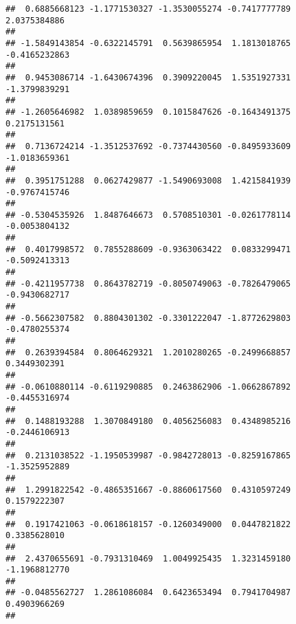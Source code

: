 \documentclass[]{article}
\begin{document}
\begin{verbatim}
##  0.6885668123 -1.1771530327 -1.3530055274 -0.7417777789  2.0375384886 
##                                                                       
## -1.5849143854 -0.6322145791  0.5639865954  1.1813018765 -0.4165232863 
##                                                                       
##  0.9453086714 -1.6430674396  0.3909220045  1.5351927331 -1.3799839291 
##                                                                       
## -1.2605646982  1.0389859659  0.1015847626 -0.1643491375  0.2175131561 
##                                                                       
##  0.7136724214 -1.3512537692 -0.7374430560 -0.8495933609 -1.0183659361 
##                                                                       
##  0.3951751288  0.0627429877 -1.5490693008  1.4215841939 -0.9767415746 
##                                                                       
## -0.5304535926  1.8487646673  0.5708510301 -0.0261778114 -0.0053804132 
##                                                                       
##  0.4017998572  0.7855288609 -0.9363063422  0.0833299471 -0.5092413313 
##                                                                       
## -0.4211957738  0.8643782719 -0.8050749063 -0.7826479065 -0.9430682717 
##                                                                       
## -0.5662307582  0.8804301302 -0.3301222047 -1.8772629803 -0.4780255374 
##                                                                       
##  0.2639394584  0.8064629321  1.2010280265 -0.2499668857  0.3449302391 
##                                                                       
## -0.0610880114 -0.6119290885  0.2463862906 -1.0662867892 -0.4455316974 
##                                                                       
##  0.1488193288  1.3070849180  0.4056256083  0.4348985216 -0.2446106913 
##                                                                       
##  0.2131038522 -1.1950539987 -0.9842728013 -0.8259167865 -1.3525952889 
##                                                                       
##  1.2991822542 -0.4865351667 -0.8860617560  0.4310597249  0.1579222307 
##                                                                       
##  0.1917421063 -0.0618618157 -0.1260349000  0.0447821822  0.3385628010 
##                                                                       
##  2.4370655691 -0.7931310469  1.0049925435  1.3231459180 -1.1968812770 
##                                                                       
## -0.0485562727  1.2861086084  0.6423653494  0.7941704987  0.4903966269 
##                                                                       

\end{verbatim}
\end{document}
